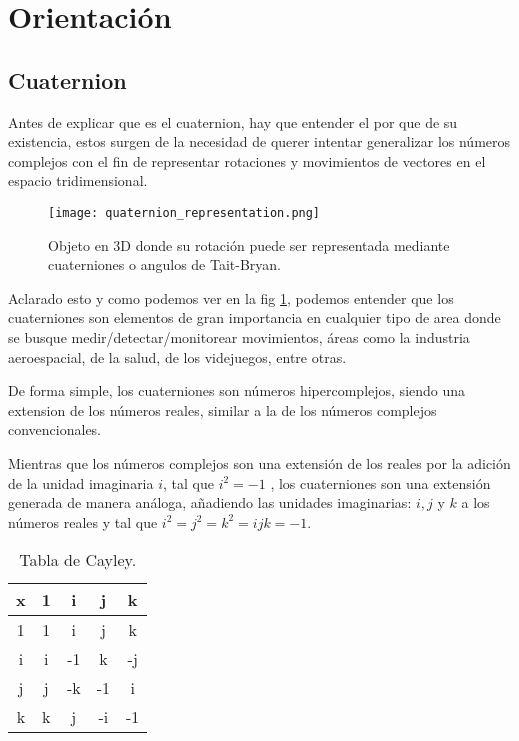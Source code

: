 
\section{Orientación}

    \subsection{Cuaternion}
        Antes de explicar que es el cuaternion, hay que entender el por que de su existencia, estos surgen de la necesidad de
        querer intentar generalizar los números complejos con el fin de representar rotaciones y movimientos de vectores en el espacio 
        tridimensional.
        \begin{figure}[htp!]
            \centering
            \texttt{[image: quaternion\_representation.png]}
            \caption{Objeto en 3D donde su rotación puede ser representada mediante cuaterniones o angulos de Tait-Bryan.}
            \label{fig: rotation_representation}
        \end{figure}
        \FloatBarrier

        Aclarado esto y como podemos ver en la fig \ref{fig: rotation_representation}, podemos entender que los cuaterniones son elementos
        de gran importancia en cualquier tipo de area donde se busque
        medir/detectar/monitorear movimientos, áreas como la industria aeroespacial, de la salud, de los videjuegos, entre otras. 

        De forma simple, los cuaterniones son números hipercomplejos, siendo una extension de los números reales, similar a la de los números complejos convencionales.
        
        Mientras que los números complejos son una extensión de los reales por la adición de la unidad imaginaria \textbf{$ i $}, tal que \textbf{$ i^2 = -1 $}
        , los cuaterniones son una extensión generada de manera análoga, añadiendo las unidades imaginarias: $i, j$ y $ k $ a los números reales 
        y tal que $ i^2 = j^2 = k^2 = ijk = -1$.

            \begin{table}[htp]
                \centering
                    \begin{tabular}{|c|c|c|c|c|}
                        \hline
                        \textbf{x} & 1 & i  & j  & k \\ \hline
                             1 & 1 & i  & j  & k \\ \hline
                             i & i & -1 & k  & -j \\ \hline
                             j & j & -k & -1 & i \\ \hline
                             k & k & j  & -i & -1 \\ 
                        \hline
                    \end{tabular}
                \caption{Tabla de Cayley.}
                \label{table: Cayley}
            \end{table}

